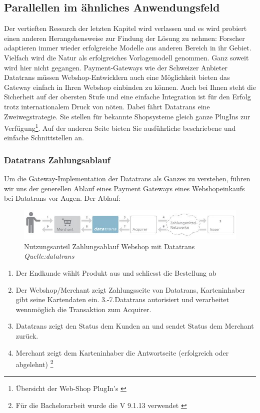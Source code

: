 \newpage

\subsection{Parallellen im ähnliches
Anwendungsfeld}\label{parallellen-im-uxe4hnliches-anwendungsfeld}

Der vertieften Research der letzten Kapitel wird verlassen und es wird
probiert einen anderen Herangehensweise zur Findung der Lösung zu
nehmen: Forscher adaptieren immer wieder erfolgreiche Modelle aus
anderen Bereich in ihr Gebiet. Vielfach wird die Natur als erfolgreiches
Vorlagemodell genommen. Ganz soweit wird hier nicht gegangen.
Payment-Gateways wie der Schweizer Anbieter Datatrans müssen
Webshop-Entwicklern auch eine Möglichkeit bieten das Gateway einfach in
Ihren Webshop einbinden zu können. Auch bei Ihnen steht die Sicherheit
auf der obersten Stufe und eine einfache Integration ist für den Erfolg
trotz internationalem Druck von nöten. Dabei fährt Datatrans eine
Zweiwegstrategie. Sie stellen für bekannte Shopsysteme gleich ganze
PlugIns zur Verfügung\footnote{Übersicht der Web-Shop PlugIn's
  \autocite{datatrans-plugin}}. Auf der anderen Seite bieten Sie
ausführliche beschriebene und einfache Schnittstellen an.

\subsubsection{Datatrans Zahlungsablauf}\label{datatrans-zahlungsablauf}

Um die Gateway-Implementation der Datatrans als Ganzes zu verstehen,
führen wir uns der generellen Ablauf eines Payment Gateways eines
Webshopeinkaufs bei Datatrans vor Augen. Der Ablauf:

\begin{figure}[htbp]
\centering
\includegraphics{images/datatrans-autorisierung.JPG}
\caption{Nutzungsanteil Zahlungsablauf Webshop mit Datatrans
\emph{Quelle:datatrans}}
\end{figure}

\begin{enumerate}
\def\labelenumi{\arabic{enumi}.}
\tightlist
\item
  Der Endkunde wählt Produkt aus und schliesst die Bestellung ab
\item
  Der Webshop/Merchant zeigt Zahlungsseite von Datatrans, Karteninhaber
  gibt seine Kartendaten ein. 3.-7.Datatrans autorisiert und verarbeitet
  wennmöglich die Transaktion zum Acquirer.
\item
  Datatrans zeigt den Status dem Kunden an und sendet Status dem
  Merchant zurück.
\item
  Merchant zeigt dem Karteninhaber die Antwortseite (erfolgreich oder
  abgelehnt) \footnote{Für die Bachelorarbeit wurde die V 9.1.13
    verwendet \autocite{datatrans-api}}
\end{enumerate}

